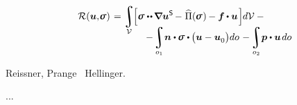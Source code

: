 \noindent
{}    ~

\nopagebreak\vspace{-0.3em}\begin{multline}\label{reissnerhellingervariationalprinciple}
\shoveleft{\mathcal{R}(\bm{u}, \hspace{-0.32ex}\linearstress) \hspace{.2ex} =
\displaystyle\integral\displaylimits_{\mathcal{V}} \hspace{-0.3ex}
\Bigl[
\linearstress \dotdotp \hspace{-0.16ex} \boldnabla {\bm{u}}^{\mathsf{S}} \hspace{-0.2ex} - \hspace{.1ex} \widehat{\potential}(\hspace{-0.1ex}\linearstress\hspace{.1ex})\hspace{-0.1ex} -
\bm{f} \hspace{-0.1ex} \dotp \bm{u}
\hspace{.2ex} \Bigr] \hspace{-0.1ex} d\mathcal{V} \hspace{.5ex}
- \hfill}
\\[-1.2em]
%
\hspace{8em}
- \hspace{-0.2ex} \displaystyle\integral\displaylimits_{o_1} \hspace{-0.4ex} \unitnormalvector \dotp \hspace{-0.1ex} \linearstress \dotp \hspace{-0.1ex} \bigl( \bm{u} - \bm{u}_{\raisemath{-0.1em}{0}} \bigr) do \hspace{.2ex}
- \hspace{-0.2ex} \integral\displaylimits_{o_2} \hspace{-0.4ex} \bm{p} \dotp \bm{u} \hspace{.25ex} do
\end{multline}

\nopagebreak\vspace{-0.2em}\noindent
{}  Reissner, Prange ~Hellinger.

...

